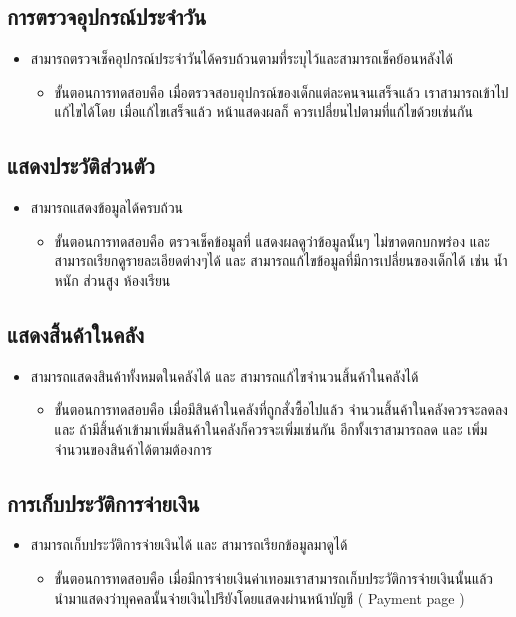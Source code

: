 \subsection{การตรวจอุปกรณ์ประจำวัน}
\begin{itemize}
    \item สามารถตรวจเช็คอุปกรณ์ประจำวันได้ครบถ้วนตามที่ระบุไว้และสามารถเช็คย้อนหลังได้
    \begin{itemize}
        \item ขั้นตอนการทดสอบคือ เมื่อตรวจสอบอุปกรณ์ของเด็กแต่ละคนจนเสร็จแล้ว  เราสามารถเข้าไปแก้ไขได้โดย  เมื่อแก้ไขเสร็จแล้ว  
        หน้าแสดงผลก็  ควรเปลี่ยนไปตามที่แก้ไขด้วยเช่นกัน        
    \end{itemize}
\end{itemize}
\subsection{แสดงประวัติส่วนตัว}
\begin{itemize}
    \item สามารถแสดงข้อมูลได้ครบถ้วน
    \begin{itemize}
        \item ขั้นตอนการทดสอบคือ ตรวจเช็คข้อมูลที่  แสดงผลดูว่าข้อมูลนั้นๆ ไม่ขาดตกบกพร่อง และ สามารถเรียกดูรายละเอียดต่างๆได้
        และ สามารถแก้ไขข้อมูลที่มีการเปลี่ยนของเด็กได้ เช่น น้ำหนัก  ส่วนสูง  ห้องเรียน         
    \end{itemize}
\end{itemize}
\subsection{แสดงสิ้นค้าในคลัง}
\begin{itemize}
    \item สามารถแสดงสินค้าทั้งหมดในคลังได้ และ สามารถแก้ไขจํานวนสิ้นค้าในคลังได้
    \begin{itemize}
        \item ขั้นตอนการทดสอบคือ  เมื่อมีสินค้าในคลังที่ถูกสั่งซื้อไปแล้ว จำนวนสิ้นค้าในคลังควรจะลดลง และ  ถ้ามีสิ้นค้าเข้ามาเพิ่มสินค้าในคลังก็ควรจะเพิ่มเช่นกัน  อีกทั้งเราสามารถลด และ เพิ่มจำนวนของสินค้าได้ตามต้องการ 	
    \end{itemize}
\end{itemize}
\subsection{การเก็บประวัติการจ่ายเงิน}
\begin{itemize}
    \item สามารถเก็บประวัติการจ่ายเงินได้ และ สามารถเรียกข้อมูลมาดูได้
    \begin{itemize}
        \item ขั้นตอนการทดสอบคือ เมื่อมีการจ่ายเงินค่าเทอมเราสามารถเก็บประวัติการจ่ายเงินนั้นแล้ว  นำมาแสดงว่าบุคคลนั้นจ่ายเงินไปรึยังโดยแสดงผ่านหน้าบัญชี ( Payment page )
    \end{itemize}
\end{itemize}



